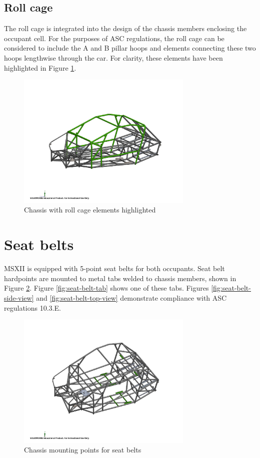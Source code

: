 \documentclass[10pt]{article}
\begin{document}
\subsection{Roll cage}
The roll cage is integrated into the design of the chassis members enclosing the occupant cell. For the purposes of ASC regulations, the roll cage can be considered to include the A and B pillar hoops and elements connecting these two hoops lengthwise through the car. For clarity, these elements have been highlighted in Figure \ref{fig:roll-cage}.

\begin{figure}
\centering
\includegraphics[width=0.75\textwidth]{figures/roll-cage}
\caption{Chassis with roll cage elements highlighted}
\label{fig:roll-cage}
\end{figure}


\section{Seat belts}
MSXII is equipped with 5-point seat belts for both occupants. Seat belt hardpoints are mounted to metal tabs welded to chassis members, shown in Figure \ref{fig:seat-belt-tab-positions}. Figure \ref{fig:seat-belt-tab} shows one of these tabs. Figures \ref{fig:seat-belt-side-view} and \ref{fig:seat-belt-top-view} demonstrate compliance with ASC regulations 10.3.E.

\begin{figure}
\centering
\includegraphics[width=0.75\textwidth]{figures/seat-belt-tab-positions}
\caption{Chassis mounting points for seat belts}
\label{fig:seat-belt-tab-positions}
\end{figure}
\end{document}
